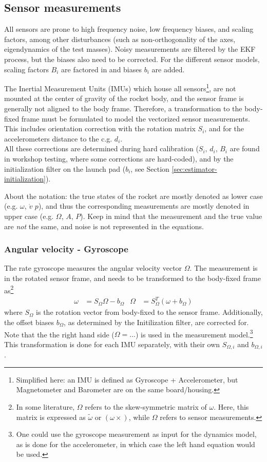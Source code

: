 \subsection{Sensor measurements}
\label{sec:model-measurements}
All sensors are prone to high frequency noise, low frequency biases, and scaling factors, among other disturbances (such as non-orthogonality of the axes, eigendynamics of the test masses).
Noisy measurements are filtered by the EKF process, but the biases also need to be corrected.
For the different sensor models, scaling factors $B_i$ are factored in and biases $b_i$ are added. 

The Inertial Measurement Units (IMUs) which house all sensors\footnote{Simplified here: an IMU is defined as Gyroscope + Accelerometer, but Magnetometer and Barometer are on the same board/housing.}, are not mounted at the center of gravity of the rocket body, and the sensor frame is generally not aligned to the body frame.
Therefore, a transformation to the body-fixed frame must be formulated to model the vectorized sensor measurements.
This includes orientation correction with the rotation matrix $S_i$, and for the accelerometers distance to the c.g. $d_i$. \\
All these corrections are determined during hard calibration ($S_i, \, d_i, \, B_i$ are found in workshop testing, where some corrections are hard-coded), and by the initialization filter on the launch pad ($b_i$, see Section \ref{sec:estimator-initialization}).

About the notation: the true states of the rocket are mostly denoted as lower case (e.g. $\omega$, $\dot v$ $p$), and thus the corresponding measurements are mostly denoted in upper case (e.g. $\Omega$, $A$, $P$).  
Keep in mind that the measurement and the true value are \textit{not} the same, and noise is not represented in the equations.


\subsubsection{Angular velocity - Gyroscope}
The rate gyroscope measures the angular velocity vector $\Omega$. 
The measurement is in the rotated sensor frame, and needs to be transformed to the  body-fixed frame as\footnote{In some literature, $\Omega$ refers to the skew-symmetric matrix of $\omega$. Here, this matrix is expressed as $\tilde \omega$ or $(\omega \times)$, while $\Omega$ refers to sensor measurements.}
\begin{align}
    \omega &= S_\Omega \Omega - b_\Omega
    &
    \Omega &= S_\Omega^T (\omega + b_\Omega)
    \label{eq:meas-gyro}
\end{align}
where $S_\Omega$ is the rotation vector from body-fixed to the sensor frame.
Additionally, the offset biases $b_\Omega$, as determined by the Initilization filter, are corrected for.
Note that the the right hand side ($\Omega = ...$) is used in the measurement model.\footnote{One could use the gyroscope measurement as input for the dynamics model, as is done for the accelerometer, in which case the left hand equation would be used.}
This transformation is done for each IMU separately, with their own $S_{\Omega, i}$ and $b_{\Omega, i}$.

